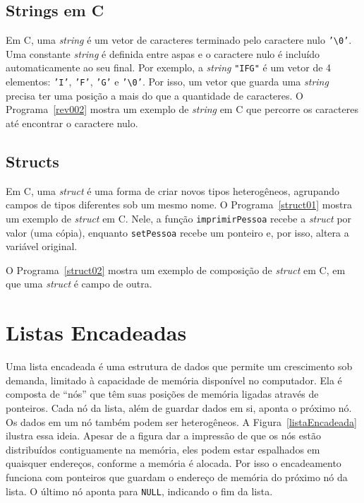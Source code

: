 \documentclass[11pt,fleqn]{book} %
\begin{document}


\subsection*{Strings em C}
Em C, uma \textit{string} é um vetor de caracteres terminado pelo caractere nulo \texttt{'\textbackslash 0'}.
Uma constante \textit{string} é definida entre aspas e o caractere nulo é incluído automaticamente ao seu final.
Por exemplo, a \textit{string} \texttt{"IFG"} é um vetor de 4 elementos: \texttt{'I'}, \texttt{'F'}, \texttt{'G'} e \texttt{'\textbackslash 0'}.
Por isso, um vetor que guarda uma \textit{string} precisa ter uma posição a mais do que a quantidade de caracteres.
O Programa~\ref{rev002} mostra um exemplo de \textit{string} em C que percorre os caracteres até encontrar o caractere nulo.



\subsection*{Structs}
Em C, uma \textit{struct} é uma forma de criar novos tipos heterogêneos, agrupando campos de tipos diferentes sob um mesmo nome.
O Programa~\ref{struct01} mostra um exemplo de \textit{struct} em C.
Nele, a função \texttt{imprimirPessoa} recebe a \textit{struct} por valor (uma cópia), enquanto \texttt{setPessoa} recebe um ponteiro e, por isso, altera a variável original.

\newpage


\newpage
O Programa~\ref{struct02} mostra um exemplo de composição de \textit{struct} em C, em que uma \textit{struct} é campo de outra. 


\section{Listas Encadeadas}

Uma lista encadeada é uma estrutura de dados que permite um crescimento sob demanda, limitado à capacidade de memória disponível no computador.
Ela é composta de ``nós'' que têm suas posições de memória ligadas através de ponteiros. 
Cada nó da lista, além de guardar dados em si, aponta o próximo nó.
Os dados em um nó também podem ser heterogêneos.
A Figura~\ref{listaEncadeada} ilustra essa ideia. 
Apesar de a figura dar a impressão de que os nós estão distribuídos contiguamente na memória, eles podem estar espalhados em quaisquer endereços, conforme a memória é alocada.
Por isso o encadeamento funciona com ponteiros que guardam o endereço de memória do próximo nó da lista.
O último nó aponta para \texttt{NULL}, indicando o fim da lista.
\end{document}
